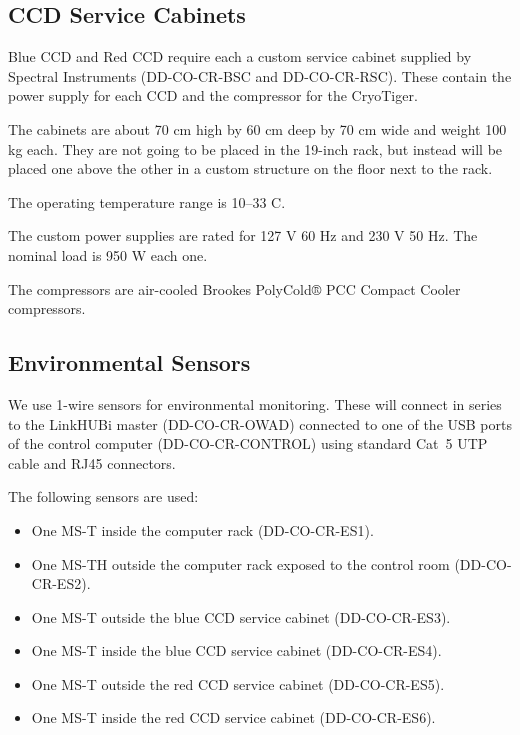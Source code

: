 \documentclass{article}
\begin{document}

\subsection{CCD Service Cabinets}

Blue CCD and Red CCD require each a custom service cabinet supplied by Spectral Instruments (DD-CO-CR-BSC and DD-CO-CR-RSC). These contain the power supply for each CCD and the compressor for the CryoTiger. 

The cabinets are about 70 cm high by 60 cm deep by 70 cm wide and weight 100 kg each. They are not going to be placed in the 19-inch rack, but instead will be placed one above the other in a custom structure on the floor next to the rack.

The operating temperature range is 10--33 C.

The custom power supplies are rated for 127 V 60 Hz and 230 V 50 Hz. The nominal load is 950 W each one.

The compressors are air-cooled Brookes PolyCold® PCC Compact Cooler compressors.

\subsection{Environmental Sensors}

We use 1-wire sensors for environmental monitoring. These will connect in series to the LinkHUBi master (DD-CO-CR-OWAD) connected to one of the USB ports of the control computer (DD-CO-CR-CONTROL) using standard Cat~5 UTP cable and RJ45 connectors.

The following sensors are used:
\begin{itemize}
\item One MS-T inside the computer rack (DD-CO-CR-ES1).
\item One MS-TH outside the computer rack exposed to the control room (DD-CO-CR-ES2).
\item One MS-T outside the blue CCD service cabinet (DD-CO-CR-ES3).
\item One MS-T inside the blue CCD service cabinet (DD-CO-CR-ES4).
\item One MS-T outside the red CCD service cabinet (DD-CO-CR-ES5).
\item One MS-T inside the red CCD service cabinet (DD-CO-CR-ES6).
\end{itemize}
\end{document}
